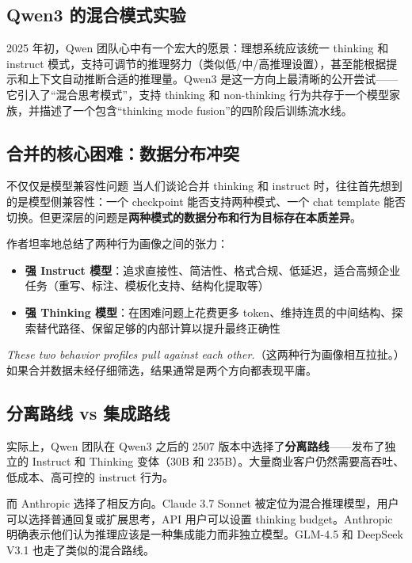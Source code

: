 \documentclass[a4paper]{article}
\begin{document}
\subsection{Qwen3 的混合模式实验}

2025 年初，Qwen 团队心中有一个宏大的愿景：理想系统应该统一 thinking 和 instruct 模式，支持可调节的推理努力（类似低/中/高推理设置），甚至能根据提示和上下文自动推断合适的推理量。Qwen3 是这一方向上最清晰的公开尝试——它引入了``混合思考模式''，支持 thinking 和 non-thinking 行为共存于一个模型家族，并描述了一个包含``thinking mode fusion''的四阶段后训练流水线。

\subsection{合并的核心困难：数据分布冲突}

\begin{warningbox}{不仅仅是模型兼容性问题}
当人们谈论合并 thinking 和 instruct 时，往往首先想到的是模型侧兼容性：一个 checkpoint 能否支持两种模式、一个 chat template 能否切换。但更深层的问题是\textbf{两种模式的数据分布和行为目标存在本质差异}。
\end{warningbox}

作者坦率地总结了两种行为画像之间的张力：

\begin{itemize}
    \item \textbf{强 Instruct 模型}：追求直接性、简洁性、格式合规、低延迟，适合高频企业任务（重写、标注、模板化支持、结构化提取等）
    \item \textbf{强 Thinking 模型}：在困难问题上花费更多 token、维持连贯的中间结构、探索替代路径、保留足够的内部计算以提升最终正确性
\end{itemize}

\textit{These two behavior profiles pull against each other.}（这两种行为画像相互拉扯。）如果合并数据未经仔细筛选，结果通常是两个方向都表现平庸。

\subsection{分离路线 vs 集成路线}

实际上，Qwen 团队在 Qwen3 之后的 2507 版本中选择了\textbf{分离路线}——发布了独立的 Instruct 和 Thinking 变体（30B 和 235B）。大量商业客户仍然需要高吞吐、低成本、高可控的 instruct 行为。

而 Anthropic 选择了相反方向。Claude 3.7 Sonnet 被定位为混合推理模型，用户可以选择普通回复或扩展思考，API 用户可以设置 thinking budget。Anthropic 明确表示他们认为推理应该是一种集成能力而非独立模型。GLM-4.5 和 DeepSeek V3.1 也走了类似的混合路线。
\end{document}
